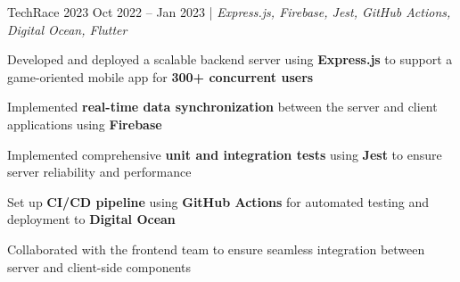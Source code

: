 \resumeSubheadings
{TechRace 2023 }
{Oct 2022 -- Jan 2023}
{}{}{| \textit{Express.js, Firebase, Jest, GitHub Actions, Digital Ocean, Flutter}}
\resumeItemListStart
\item Developed and deployed a scalable backend server using \textbf{Express.js} to support a game-oriented mobile app for \textbf{300+ concurrent users}
\item Implemented \textbf{real-time data synchronization} between the server and client applications using \textbf{Firebase}
\item Implemented comprehensive \textbf{unit and integration tests} using \textbf{Jest} to ensure server reliability and performance
\item Set up \textbf{CI/CD pipeline} using \textbf{GitHub Actions} for automated testing and deployment to \textbf{Digital Ocean}
\item Collaborated with the frontend team to ensure seamless integration between server and client-side components
\resumeItemListEnd